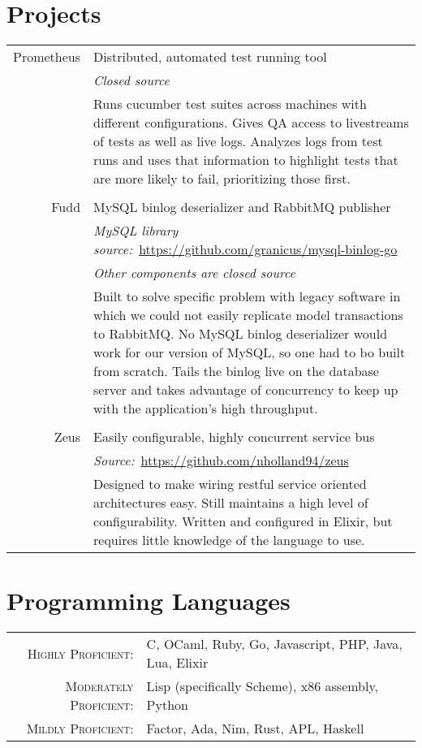 \documentclass[a4paper,10pt]{article}
\begin{document}
\section{Projects}
\begin{tabular}{r|p{11cm}}
  Prometheus  & Distributed, automated test running tool\\
              & \emph{Closed source}\\
              & \footnotesize{Runs cucumber test suites across machines with different configurations. Gives QA access to livestreams of tests as well as live logs. Analyzes logs from test runs and uses that information to highlight tests that are more likely to fail, prioritizing those first.}\\
  \multicolumn{2}{c}{}\\
  Fudd        & MySQL binlog deserializer and RabbitMQ publisher\\
              & \emph{MySQL library source:}\ \href{https://github.com/granicus/mysql-binlog-go}{https://github.com/granicus/mysql-binlog-go}\\
              & \emph{Other components are closed source}\\
              & \footnotesize{Built to solve specific problem with legacy software in which we could not easily replicate model transactions to RabbitMQ. No MySQL binlog deserializer would work for our version of MySQL, so one had to bo built from scratch. Tails the binlog live on the database server and takes advantage of concurrency to keep up with the application's high throughput.}\\
  \multicolumn{2}{c}{}\\
  Zeus        & Easily configurable, highly concurrent service bus\\
              & \emph{Source:}\ \href{https://github.com/nholland94/zeus}{https://github.com/nholland94/zeus}\\
              & \footnotesize{Designed to make wiring restful service oriented architectures easy. Still maintains a high level of configurability. Written and configured in Elixir, but requires little knowledge of the language to use.}\\
\end{tabular}

\section{Programming Languages}
\begin{tabular}{rl}
  \textsc{Highly Proficient:}     & C, OCaml, Ruby, Go, Javascript, PHP, Java, Lua, Elixir\\
  \textsc{Moderately Proficient:} & Lisp (specifically Scheme), x86 assembly, Python\\
  \textsc{Mildly Proficient:}     & Factor, Ada, Nim, Rust, APL, Haskell\\
\end{tabular}
\end{document}
